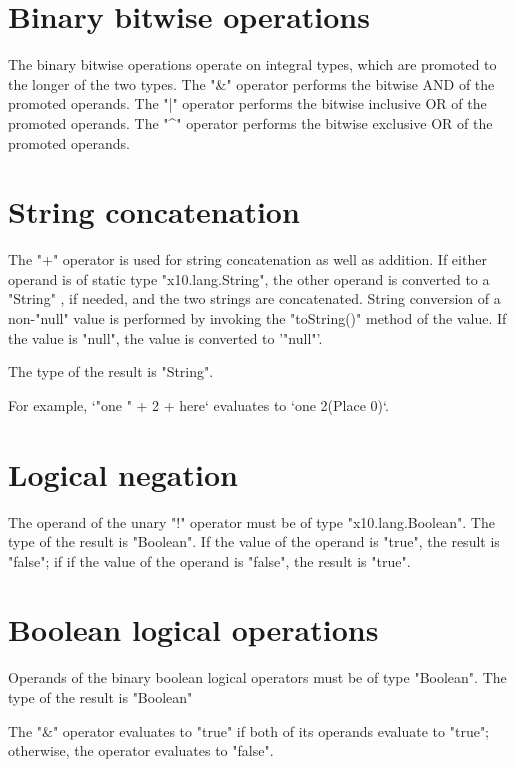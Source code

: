 \section{Binary bitwise operations}

The binary bitwise operations operate on integral types, which are promoted to
the longer of the two types.
The \xcd"&" operator  performs the bitwise AND of the promoted operands.
The \xcd"|" operator  performs the bitwise inclusive OR of the promoted operands.
The \xcd"^" operator  performs the bitwise exclusive OR of the promoted operands.

\section{String concatenation}

The \xcd"+"  operator is used for string concatenation 
 as well as addition.
If either operand is of static type \xcd"x10.lang.String",
 the other operand is converted to a \xcd"String" , if needed,
  and  the two strings  are concatenated.
 String conversion of a non-\xcd"null" value is  performed by invoking the
 \xcd"toString()" method of the value.
  If the value is \xcd"null", the value is converted to 
  \xcd'"null"'.

The type of the result is \xcd"String".

 For example, 
      \xcd`"one " + 2 + here` 
      evaluates to  \xcd`one 2(Place 0)`.  

\section{Logical negation}

The operand of the  unary \xcd"!" operator 
must be of type \xcd"x10.lang.Boolean".
The type of the result is \xcd"Boolean".
If the value of the operand is \xcd"true", the result is \xcd"false"; if
if the value of the operand  is \xcd"false", the result is \xcd"true".

\section{Boolean logical operations}

Operands of the binary boolean logical operators must be of type \xcd"Boolean".
The type of the result is \xcd"Boolean"

The \xcd"&" operator  evaluates to \xcd"true" if both of its
operands evaluate to \xcd"true"; otherwise, the operator
evaluates to \xcd"false".

